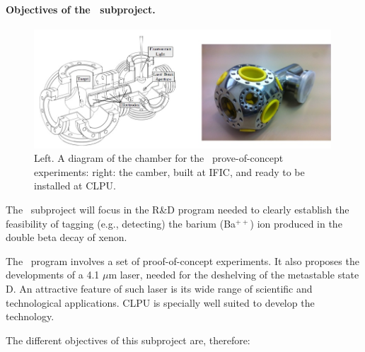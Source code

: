 \paragraph{Objectives of the \BATA\ subproject.}

\begin{figure}
\begin{center}
\includegraphics[width=0.99\textwidth]{img/BChamber.jpg}
\caption{\small Left. A diagram of the chamber for the \BATA\ prove-of-concept experiments: right: the camber, built at IFIC, and ready to be installed at CLPU.}
\label{fig:chamber}
\end{center}
\end{figure}

The \BATA\ subproject will focus in the R\&D program needed to clearly establish the feasibility of tagging (e.g., detecting) the barium (Ba$^{++}$) ion produced in the double beta decay of xenon. 

The \BATA\ program involves a set of proof-of-concept experiments. It also proposes the developments of a 4.1 $\mu$m laser, needed for the deshelving of the metastable state D. An attractive feature of such laser is its wide range of scientific and technological applications. CLPU is specially well suited to develop the technology.

The different objectives of this subproject are, therefore:

